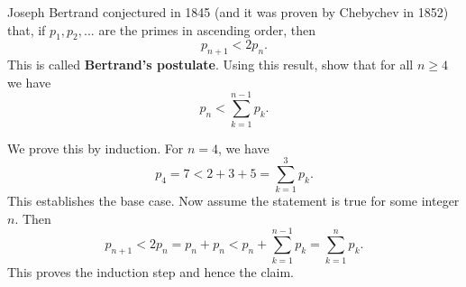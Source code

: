 \documentclass[11pt,dvipsnames]{book}
\numberwithin{figure}{section} %
\numberwithin{table}{section} %
\begin{document}
\begin{exercise} Joseph Bertrand conjectured in 1845 (and it was proven by Chebychev in 1852) that, if $p_{1},p_{2},...$ are the primes in ascending order, then
\[
p_{n+1}<2p_{n}.
\]
This is called {\bf Bertrand's postulate}. Using this result, show that for all $n\geq 4$ we have
\[
p_{n} <\sum_{k=1}^{n-1} p_{k}.
\]
\begin{solution}
We prove this by induction. For $n=4$, we have
\[
p_{4}=7 < 2+3+5 = \sum_{k=1}^{3} p_{k}.
\]
This establishes the base case. Now assume the statement is true for some integer $n$. Then
\[
p_{n+1}<2p_{n} = p_{n}+p_{n} < p_{n}+\sum_{k=1}^{n-1} p_{k} = \sum_{k=1}^{n} p_{k}.
\]
This proves the induction step and hence the claim.
\end{solution}
\end{exercise}
\end{document}
